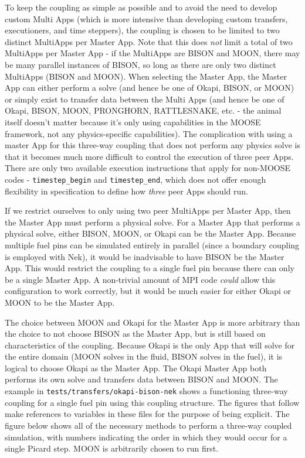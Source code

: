 \documentclass[10pt]{article}
\numberwithin{equation}{section} %
\begin{document}
To keep the coupling as simple as possible and to avoid the need to develop custom Multi Apps (which is more intensive than developing custom transfers, executioners, and time steppers), the coupling is chosen to be limited to two distinct MultiApps per Master App. Note that this does {\it not} limit a total of two MultiApps per Master App - if the MultiApps are BISON and MOON, there may be many parallel instances of BISON, so long as there are only two distinct MultiApps (BISON and MOON). When selecting the Master App, the Master App can either perform a solve (and hence be one of Okapi, BISON, or MOON) or simply exist to transfer data between the Multi Apps (and hence be one of Okapi, BISON, MOON, PRONGHORN, RATTLESNAKE, etc. - the animal itself doesn't matter because it's only using capabilities in the MOOSE framework, not any physics-specific capabilities). The complication with using a master App for this three-way coupling that does not perform any physics solve is that it becomes much more difficult to control the execution of three peer Apps. There are only two available execution instructions that apply for non-MOOSE codes - {\tt timestep\_begin} and {\tt timestep\_end}, which does not offer enough flexibility in specification to define how {\it three} peer Apps should run.

If we restrict ourselves to only using two peer MultiApps per Master App, then the Master App must perform a physical solve. For a Master App that performs a physical solve, either BISON, MOON, or Okapi can be the Master App. Because multiple fuel pins can be simulated entirely in parallel (since a boundary coupling is employed with Nek), it would be inadvisable to have BISON be the Master App. This would restrict the coupling to a single fuel pin because there can only be a single Master App. A non-trivial amount of MPI code {\it could} allow this configuration to work correctly, but it would be much easier for either Okapi or MOON to be the Master App. 

The choice between MOON and Okapi for the Master App is more arbitrary than the choice to not choose BISON as the Master App, but is still based on characteristics of the coupling. Because Okapi is the only App that will solve for the entire domain (MOON solves in the fluid, BISON solves in the fuel), it is logical to choose Okapi as the Master App. The Okapi Master App both performs its own solve and transfers data between BISON and MOON. The example in {\tt tests/transfers/okapi-bison-nek} shows a functioning three-way coupling for a single fuel pin using this coupling structure. The figures that follow make references to variables in these files for the purpose of being explicit. The figure below shows all of the necessary methods to perform a three-way coupled simulation, with numbers indicating the order in which they would occur for a single Picard step. MOON is arbitrarily chosen to run first. 
\end{document}
